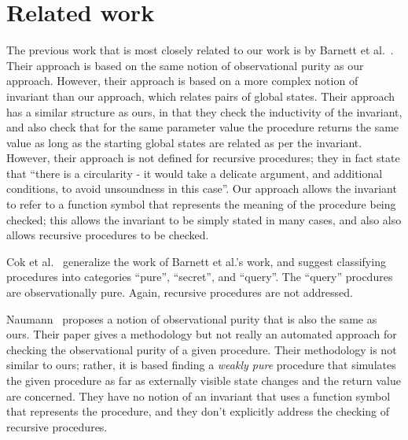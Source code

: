\section{Related work}\label{sec:related}

The previous work that is most closely related to our work is by Barnett et
al.~\cite{barnett200499,barnett2006allowing}. Their approach is based on
the same notion of observational purity as our approach. However, their
approach is based on a more complex notion of invariant than our approach,
which relates pairs of global states. Their approach has a similar
structure as ours, in that they check the inductivity of the invariant, and
also check that for the same parameter value the procedure returns the same
value as long as the starting global states are related as per the
invariant. However, their approach is not defined for recursive procedures;
they in fact state that  ``there is a circularity - it would
take a delicate argument, and additional conditions, to avoid unsoundness
in this case''. Our approach allows the invariant to refer to a function
symbol that represents the meaning of the procedure being checked; this
allows the invariant to be simply stated in many cases, and also also
allows recursive procedures to be checked. 

Cok et al.~\cite{cok2008extensions}  generalize the work of Barnett
et al.'s work, and suggest classifying procedures into categories ``pure'',
``secret'', and ``query''. The ``query'' procdures are observationally
pure. Again, recursive procedures are not addressed.

Naumann~\cite{naumann2007observational} proposes a notion of observational
purity that is also the same as ours. Their paper gives a methodology but
not really an automated approach for checking the observational purity of a
given procedure. Their methodology is not similar to ours; rather, it is
based finding a \emph{weakly pure} procedure that simulates the given
procedure as far as externally visible state changes and the return value
are concerned. They have no notion of an invariant that uses a
function symbol that represents the procedure, and they don't explicitly
address the checking of recursive procedures.

